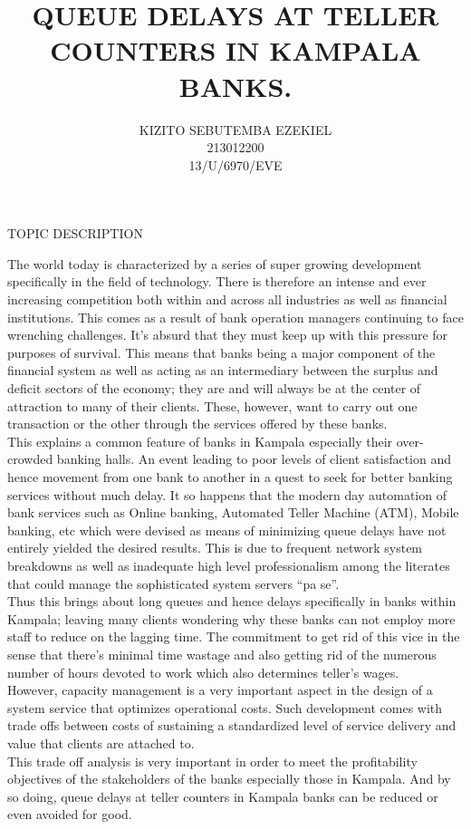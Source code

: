\documentclass[10pt,a4paper]{report}
\author{KIZITO SEBUTEMBA EZEKIEL\\213012200\\13/U/6970/EVE
 }
\title{QUEUE DELAYS AT TELLER COUNTERS IN KAMPALA BANKS.}
\begin{document}
	\begin{center}
		\maketitle 	TOPIC DESCRIPTION
	\end{center}
	\begin{flushleft}
	The world today is characterized by a series of super growing development specifically in the field of technology. There is therefore an intense and ever increasing competition both within and across all  industries as well as financial institutions. This comes as a result of bank operation managers continuing to face wrenching challenges. It's absurd that they must keep up with this pressure for purposes of survival. This means that banks being a major component of the financial system as well as acting as an intermediary between the surplus and deficit sectors of the economy; they are and will always be at the center of attraction to many of their clients. These, however, want to carry out one transaction or the other through the services offered by these banks.\\
	This explains a common feature of banks in Kampala especially their over-crowded banking halls. An event leading to poor levels of client satisfaction and hence movement from one bank to  another in a quest to seek for better banking services without much delay. It so happens that the modern day automation of bank services such as Online banking, Automated Teller Machine (ATM), Mobile banking, etc which were devised as means of minimizing queue delays have not entirely yielded the desired results. This is due to frequent network system breakdowns as well as inadequate high level professionalism among the literates that could manage the sophisticated system servers “pa se”.\\
	Thus this brings about long queues and hence delays specifically in banks within Kampala; leaving many clients wondering why these banks can not employ more staff to reduce on the lagging time. The commitment to get rid of this vice in the sense that there’s minimal time wastage and also getting rid of the numerous number of hours devoted to work which also determines teller's wages.\\
	However, capacity management is a very important aspect in the design of a system service that optimizes operational costs. Such development comes with trade offs between costs of sustaining a standardized level of service delivery and value that clients are attached to.\\
	This trade off analysis is very important in order to meet the profitability objectives of the stakeholders of the banks especially those in Kampala. And by so doing, queue delays at teller counters in Kampala banks can be reduced or even avoided for good.




\end{flushleft}
\end{document}
